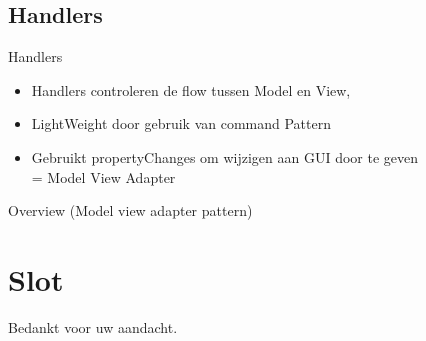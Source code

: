 \documentclass[11pt,t]{beamer}
\begin{document}
\subsection{Handlers}

\begin{frame}{Handlers}
\begin{itemize}
\item Handlers controleren de flow tussen Model en View,
\item LightWeight door gebruik van command Pattern
\item Gebruikt propertyChanges om wijzigen aan GUI door te geven \\
= Model View Adapter
\end{itemize}
\end{frame}

\begin{frame}{Overview (Model view adapter pattern)}

\end{frame}
\section{Slot}
\begin{frame}
\vspace{1.5in}
\begin{center}
Bedankt voor uw aandacht.
\end{center}
\end{frame}
\end{document}
